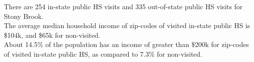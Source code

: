 \documentclass{article}
\begin{document}



There are 254 in-state public HS visits and 335 out-of-state public HS visits for Stony Brook. \\

The average median household income of zip-codes of visited in-state public HS is \$104k, and \$65k for non-visited. \\

About 14.5\% of the population has an income of greater than \$200k for zip-codes of visited in-state public HS, as compared to 7.3\% for non-visited. \\
\end{document}
